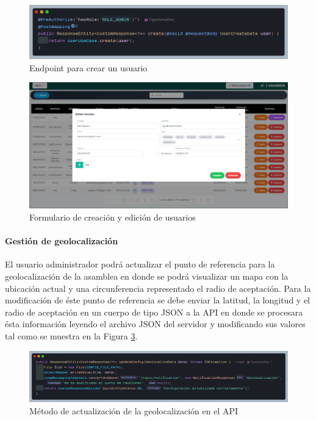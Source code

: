 \begin{figure}[H]
    \centering
    \includegraphics[width=1\textwidth]{resources/images/api-crotroller-create-user}
    \caption{Endpoint para crear un usuario}
    \label{fig:api-controller-create-user}
\end{figure}

\begin{figure}[H]
    \centering
    \includegraphics[width=1\textwidth]{resources/images/sw-usuarios-form}
    \caption{Formulario de creación y edición de usuarios}
    \label{fig:sw-create-user-form}
\end{figure}


\paragraph{Gestión de geolocalización}

El usuario administrador podrá actualizar el punto de referencia para la geolocalización de la asamblea en donde se podrá visualizar un mapa con la ubicación actual y una circunferencia representado el radio de aceptación.
Para la modificación de éste punto de referencia se debe enviar la latitud, la longitud y el radio de aceptación en un cuerpo de tipo JSON a la API en donde se procesara ésta información leyendo el archivo JSON del servidor y modificando sus valores tal como se muestra en la Figura \ref{fig:api-geolocation-update}.


\begin{figure}[H]
    \centering
    \includegraphics[width=1\textwidth]{resources/images/api-geolocation-update-method}
    \caption{Método de actualización de la geolocalización en el API}
    \label{fig:api-geolocation-update}
\end{figure}

